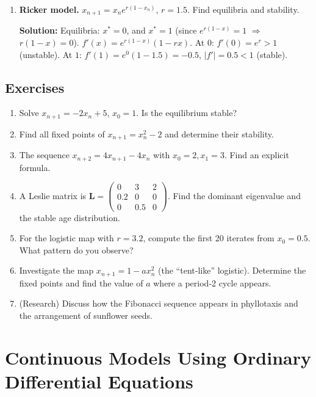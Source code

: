\documentclass[12pt,a4paper]{book}
\begin{document}
\begin{enumerate}[leftmargin=*, label=\textbf{Example 2.\arabic*}]
    \textbf{Solution:} $f(x)=-x^3$. Fixed point $x^*=0$, $f'(0)=0$ (super‑stable). For $|x_0|<1$, $|x_{n+1}| = |x_n|^3$, so magnitude shrinks extremely fast; sequence alternates sign. For $|x_0|>1$, $|x_n| \to \infty$.

    \item \textbf{Ricker model.}
    $x_{n+1} = x_n e^{r(1-x_n)}$, $r=1.5$. Find equilibria and stability.

    \textbf{Solution:} Equilibria: $x^*=0$, and $x^*=1$ (since $e^{r(1-x)}=1$ $\Rightarrow$ $r(1-x)=0$). $f'(x) = e^{r(1-x)}(1 - r x)$.
    At $0$: $f'(0)=e^r >1$ (unstable). At $1$: $f'(1)=e^0(1-1.5) = -0.5$, $|f'|=0.5<1$ (stable).
\end{enumerate}

\section{Exercises}
\begin{enumerate}[leftmargin=*, label=\textbf{Exercise 2.\arabic*}]
    \item Solve $x_{n+1} = -2 x_n + 5$, $x_0=1$. Is the equilibrium stable?
    \item Find all fixed points of $x_{n+1} = x_n^2 - 2$ and determine their stability.
    \item The sequence $x_{n+2} = 4 x_{n+1} - 4 x_n$ with $x_0=2, x_1=3$. Find an explicit formula.
    \item A Leslie matrix is $\mathbf{L} = \begin{pmatrix} 0 & 3 & 2 \\ 0.2 & 0 & 0 \\ 0 & 0.5 & 0 \end{pmatrix}$. Find the dominant eigenvalue and the stable age distribution.
    \item For the logistic map with $r=3.2$, compute the first 20 iterates from $x_0=0.5$. What pattern do you observe?
    \item Investigate the map $x_{n+1} = 1 - a x_n^2$ (the “tent‑like” logistic). Determine the fixed points and find the value of $a$ where a period‑2 cycle appears.
    \item (Research) Discuss how the Fibonacci sequence appears in phyllotaxis and the arrangement of sunflower seeds.
\end{enumerate}

\chapter{Continuous Models Using Ordinary Differential Equations}
\end{document}
